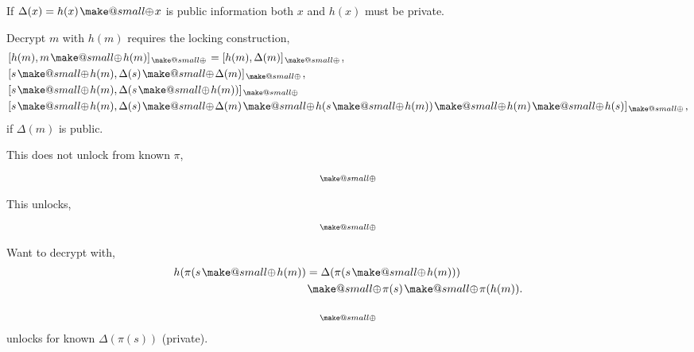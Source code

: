 \documentclass[twocolumn, aps, amsmath, amssymb, nofootinbib, superscriptaddress, longbibliography, doublefloatfix, table-of-contents, eqsecnum, rmp]{revtex4-2}
\makeatletter
\newcommand{\soplus}{{{\hspace{1pt}}{\mathbin{\mathpalette\make@small\oplus}}}{\hspace{1pt}}}
\newcommand{\make@small}[2]{%
  \vcenter{\hbox{%
    \scalebox{0.6}{$\m@th#1#2$}%
  }}%
}
\makeatother
\begin{document}
If $\Delta(x)=h(x)\soplus x$ is public information both $x$ and $h(x)$ must be private.

Decrypt $m$ with $h(m)$ requires the locking construction,
\begin{align}
	&[h(m), m\soplus h(m)]_\soplus	= [h(m), \Delta(m)]_\soplus,\nonumber\\
	&[s\soplus h(m), \Delta(s) \soplus \Delta(m)]_\soplus,\nonumber\\
	&[s\soplus h(m), \Delta(s\soplus h(m))]_\soplus \nonumber\\
	&[s\soplus h(m), \Delta(s) \soplus \Delta(m) \soplus h(s\soplus h(m)) \soplus h(m) \soplus h(s)]_\soplus,\nonumber\\
\end{align}
if $\Delta(m)$ is public.


This does not unlock from known $\pi$,
\begin{align}
	[h(\pi(m)), \pi(m) \soplus h(m)]_\soplus
\end{align}

This unlocks,
\begin{align}
	[h(\pi(s \soplus m)), \Delta(s \soplus m)]_\soplus
\end{align}


Want to decrypt with,
\begin{align}
	h(\pi(s\soplus h(m)) &= \Delta(\pi(s\soplus h(m))) \nonumber\\
	&\soplus \pi(s) \soplus \pi(h(m)).
\end{align}

\begin{align}
	[h(m), \Delta(\pi(m))\soplus \Delta(\pi(s))]_\soplus
\end{align}
unlocks for known $\Delta(\pi(s))$ (private).
\end{document}
